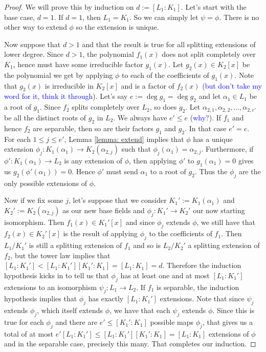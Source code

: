 \documentclass[11pt]{article}
\theoremstyle{definition}
\numberwithin{equation}{subsection}
\newcommand{\blue}[1]{\textcolor{blue}{#1}}
\begin{document}
\begin{proof}
    We will prove this by induction on $d := [L_1 : K_1]$.
    Let's start with the base case, $d = 1$.
    If $d = 1$, then $L_1 = K_1$.
    So we can simply let $\psi = \phi$.
    There is no other way to extend $\phi$ so the extension is unique.

    Now suppose that $d > 1$ and that the result is true for all splitting extensions of lower degree.
    Since $d > 1$, the polynomial $f_1(x)$ does not split completely over $K_1$, hence must have some irreducible factor $g_1(x)$.
    Let $g_2(x) \in K_2[x]$ be the polynomial we get by applying $\phi$ to each of the coefficients of $g_1(x)$.
    Note that $g_2(x)$ is irreducible in $K_2[x]$ and is a factor of $f_2(x)$ (\blue{but don't take my word for it, think it through}).
    Let's say $e := \deg g_1 = \deg g_2$ and let $\alpha_1 \in L_1$ be a root of $g_1$.
    Since $f_2$ splits completely over $L_2$, so does $g_2$.
    Let $\alpha_{2,1}, \alpha_{2,2},\ldots, \alpha_{2,e'}$ be all the distinct roots of $g_2$ in $L_2$.
    We always have $e' \leq e$ (\blue{why?}).
    If $f_1$ and hence $f_2$ are separable, then so are their factors $g_1$ and $g_2$.
    In that case $e' = e$.
    For each $1 \leq j \leq e'$, Lemma \ref{lemma: extend} implies that $\phi$ has a unique extension $\phi_j : K_1(\alpha_1) \to K_2(\alpha_{2,j})$ such that $\phi_j(\alpha_1) = \alpha_{2,j}$.
    Furthermore, if $\phi' : K_1(\alpha_1) \to L_2$ is any extension of $\phi$, then applying $\phi'$ to $g_1(\alpha_1) = 0$ gives us $g_2(\phi'(\alpha_1)) = 0$.
    Hence $\phi'$ must send $\alpha_1$ to a root of $g_2$.
    Thus the $\phi_j$ are the only possible extensions of $\phi$.

    Now if we fix some $j$, let's suppose that we consider $K_1' := K_1(\alpha_1)$ and $K_2' := K_2(\alpha_{2,j})$ as our new base fields and $\phi_j : K_1' \to K_2'$ our now starting isomorphism.
    Then $f_1(x) \in K_1'[x]$ and since $\phi_j$ extends $\phi$, we still have that $f_2(x) \in K_2'[x]$ is the result of applying $\phi_j$ to the coefficients of $f_1$.
    Then $L_1/K_1'$ is still a splitting extension of $f_1$ and so is $L_2/K_2'$ a splitting extension of $f_2$, but the tower law implies that $[L_1 : K_1'] < [L_1 : K_1'][K_1' : K_1] = [L_1 : K_1] = d$.
    Therefore the induction hypothesis kicks in to tell us that $\phi_j$ has at least one and at most $[L_1 : K_1']$ extensions to an isomorphism $\psi_j : L_1 \to L_2$.
    If $f_1$ is separable, the induction hypothesis implies that $\phi_j$ has exactly $[L_1 : K_1']$ extensions.
    Note that since $\psi_j$ extends $\phi_j$, which itself extends $\phi$, we have that each $\psi_j$ extends $\phi$.
    Since this is true for each $\phi_j$ and there are $e' \leq [K_1' : K_1]$ possible maps $\phi_j$, that gives us a total of at most $e'[L_1 : K_1'] \leq [L_1 : K_1'][K_1' : K_1] = [L_1 : K_1]$ extensions of $\phi$ and in the separable case, precisely this many.
    That completes our induction.
\end{proof}
\end{document}
